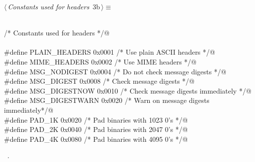 \documentclass[10pt,a4paper,twoside,notitlepage]{article}
\begin{document}
\begin{flushleft}
\begin{list}{}{\setlength{\itemsep}{-\parsep}\setlength{\itemindent}{-\leftmargin}}
\item{}
\end{list}
\vspace{4ex}
\end{flushleft}
\begin{flushleft} \small\label{scrap2}\raggedright\small
{} $\langle\,${\itshape Constants used for headers}\nobreak\ {\footnotesize {3b}}$\,\rangle\equiv$
\vspace{-1ex}
\begin{list}{}{} \item
\mbox{}\verb@@\\
\mbox{}\verb@  /* Constants used for headers */@\\
\mbox{}\verb@@\\
\mbox{}\verb@#define PLAIN_HEADERS   0x0001  /* Use plain ASCII headers            */@\\
\mbox{}\verb@#define MIME_HEADERS    0x0002  /* Use MIME headers                   */@\\
\mbox{}\verb@#define MSG_NODIGEST    0x0004  /* Do not check message digests       */@\\
\mbox{}\verb@#define MSG_DIGEST      0x0008  /* Check message digests              */@\\
\mbox{}\verb@#define MSG_DIGESTNOW   0x0010  /* Check message digests immediately  */@\\
\mbox{}\verb@#define MSG_DIGESTWARN  0x0020  /* Warn on message digests immediately*/@\\
\mbox{}\verb@#define PAD_1K          0x0020  /* Pad binaries with 1023 0's         */@\\
\mbox{}\verb@#define PAD_2K          0x0040  /* Pad binaries with 2047 0's         */@\\
\mbox{}\verb@#define PAD_4K          0x0080  /* Pad binaries with 4095 0's         */@\\
\mbox{}\verb@@{\NWsep}
\end{list}
\vspace{-1.5ex}
\footnotesize
\begin{list}{}{\setlength{\itemsep}{-\parsep}\setlength{\itemindent}{-\leftmargin}}
\item \NWtxtMacroRefIn\ .

\item{}
\end{list}
\vspace{4ex}
\end{flushleft}
\end{document}
